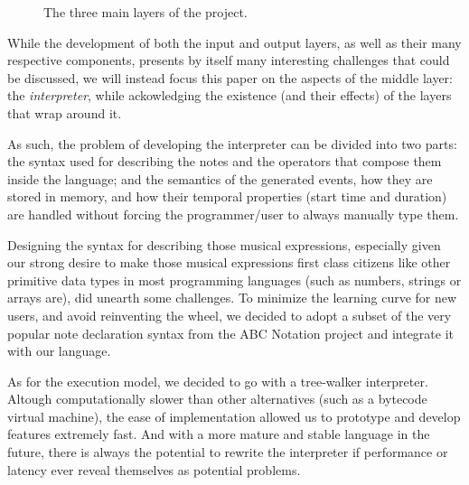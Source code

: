 \documentclass[a4paper,UKenglish,cleveref, autoref]{oasics-v2019}
\begin{document}
\begin{figure}[ht]
  \centering
  {%
  \setlength{\fboxsep}{0pt}%
  \setlength{\fboxrule}{0pt}%
  }%
  \caption{The three main layers of the project.}
  \label{fig:architecture}
\end{figure}

While the development of both the input and output layers, as well as their many respective components, presents by itself many interesting challenges that could be discussed, we will instead focus this paper on the aspects of the middle layer: the \textit{interpreter}, while ackowledging the existence (and their effects) of the layers that wrap around it.

As such, the problem of developing the interpreter can be divided into two parts: the syntax used for describing the notes and the operators that compose them inside the language; and the semantics of the generated events, how they are stored in memory, and how their temporal properties (start time and duration) are handled without forcing the programmer/user to always manually type them. 

Designing the syntax for describing those musical expressions, especially given our strong desire to make those musical expressions first class citizens like other primitive data types in most programming languages (such as numbers, strings or arrays are), did unearth some challenges. To minimize the learning curve for new users, and avoid reinventing the wheel, we decided to adopt a subset of the very popular note declaration syntax from the ABC Notation project\cite{AbcNotation, AbcPlus} and integrate it with our language.

As for the execution model, we decided to go with a tree-walker interpreter\cite{CraftingInterpreters}. Altough computationally slower than other alternatives (such as a bytecode virtual machine), the ease of implementation allowed us to prototype and develop features extremely fast. And with a more mature and stable language in the future, there is always the potential to rewrite the interpreter if performance or latency ever reveal themselves as potential problems.
\end{document}
